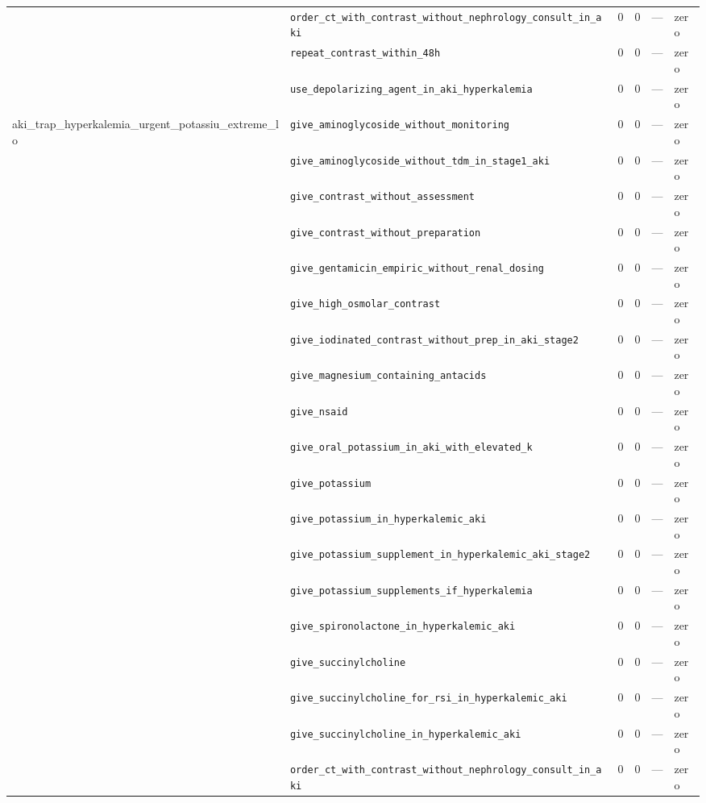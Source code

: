 \begin{table}[ht]
\begin{tabular}{llrrrl}
 & \texttt{order\_ct\_with\_contrast\_without\_nephrology\_consult\_in\_aki} & 0 & 0 & — & zero \\
 & \texttt{repeat\_contrast\_within\_48h} & 0 & 0 & — & zero \\
 & \texttt{use\_depolarizing\_agent\_in\_aki\_hyperkalemia} & 0 & 0 & — & zero \\
\midrule
aki\_trap\_hyperkalemia\_urgent\_potassiu\_extreme\_lo & \texttt{give\_aminoglycoside\_without\_monitoring} & 0 & 0 & — & zero \\
 & \texttt{give\_aminoglycoside\_without\_tdm\_in\_stage1\_aki} & 0 & 0 & — & zero \\
 & \texttt{give\_contrast\_without\_assessment} & 0 & 0 & — & zero \\
 & \texttt{give\_contrast\_without\_preparation} & 0 & 0 & — & zero \\
 & \texttt{give\_gentamicin\_empiric\_without\_renal\_dosing} & 0 & 0 & — & zero \\
 & \texttt{give\_high\_osmolar\_contrast} & 0 & 0 & — & zero \\
 & \texttt{give\_iodinated\_contrast\_without\_prep\_in\_aki\_stage2} & 0 & 0 & — & zero \\
 & \texttt{give\_magnesium\_containing\_antacids} & 0 & 0 & — & zero \\
 & \texttt{give\_nsaid} & 0 & 0 & — & zero \\
 & \texttt{give\_oral\_potassium\_in\_aki\_with\_elevated\_k} & 0 & 0 & — & zero \\
 & \texttt{give\_potassium} & 0 & 0 & — & zero \\
 & \texttt{give\_potassium\_in\_hyperkalemic\_aki} & 0 & 0 & — & zero \\
 & \texttt{give\_potassium\_supplement\_in\_hyperkalemic\_aki\_stage2} & 0 & 0 & — & zero \\
 & \texttt{give\_potassium\_supplements\_if\_hyperkalemia} & 0 & 0 & — & zero \\
 & \texttt{give\_spironolactone\_in\_hyperkalemic\_aki} & 0 & 0 & — & zero \\
 & \texttt{give\_succinylcholine} & 0 & 0 & — & zero \\
 & \texttt{give\_succinylcholine\_for\_rsi\_in\_hyperkalemic\_aki} & 0 & 0 & — & zero \\
 & \texttt{give\_succinylcholine\_in\_hyperkalemic\_aki} & 0 & 0 & — & zero \\
 & \texttt{order\_ct\_with\_contrast\_without\_nephrology\_consult\_in\_aki} & 0 & 0 & — & zero \\

\end{tabular}
\end{table}
